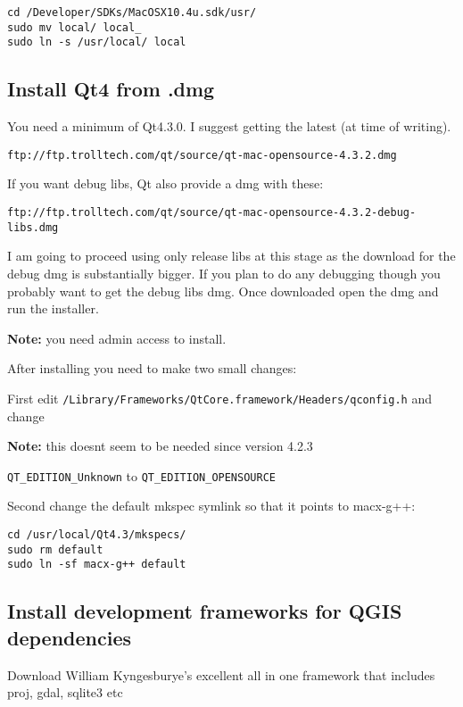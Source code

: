 \begin{verbatim}
cd /Developer/SDKs/MacOSX10.4u.sdk/usr/
sudo mv local/ local_
sudo ln -s /usr/local/ local
\end{verbatim}

\subsection{Install Qt4 from .dmg}
You need a minimum of Qt4.3.0. I suggest getting the latest (at time of writing).

\begin{verbatim}
ftp://ftp.trolltech.com/qt/source/qt-mac-opensource-4.3.2.dmg
\end{verbatim}

If you want debug libs, Qt also provide a dmg with these:

\begin{verbatim}
ftp://ftp.trolltech.com/qt/source/qt-mac-opensource-4.3.2-debug-libs.dmg
\end{verbatim}

I am going to proceed using only release libs at this stage as the download for
the debug dmg is substantially bigger. If you plan to do any debugging though
you probably want to get the debug libs dmg. Once downloaded open the dmg and run the installer. 

\textbf{Note:} you need admin access to install.

After installing you need to make two small changes:

First edit \texttt{/Library/Frameworks/QtCore.framework/Headers/qconfig.h} and
change 

\textbf{Note:} this doesnt seem to be needed since version 4.2.3

\texttt{QT\_EDITION\_Unknown} to \texttt{QT\_EDITION\_OPENSOURCE}

Second change the default mkspec symlink so that it points to macx-g++:

\begin{verbatim}
cd /usr/local/Qt4.3/mkspecs/ 
sudo rm default 
sudo ln -sf macx-g++ default
\end{verbatim}

\subsection{Install development frameworks for QGIS dependencies}
Download William Kyngesburye's excellent all in one framework that includes
proj, gdal, sqlite3 etc

